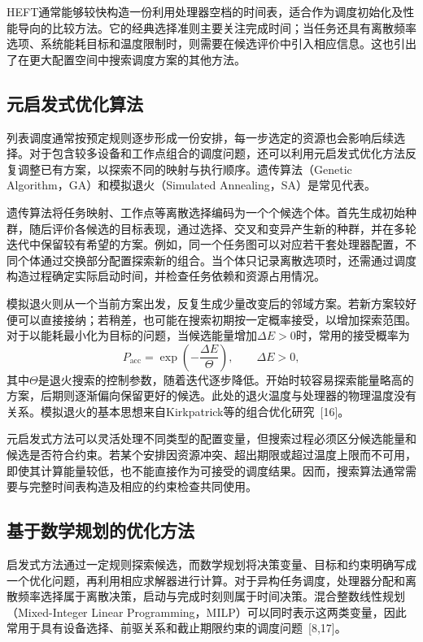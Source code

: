 HEFT通常能够较快构造一份利用处理器空档的时间表，适合作为调度初始化及性能导向的比较方法。它的经典选择准则主要关注完成时间；当任务还具有离散频率选项、系统能耗目标和温度限制时，则需要在候选评价中引入相应信息。这也引出了在更大配置空间中搜索调度方案的其他方法。

\subsection{元启发式优化算法}

列表调度通常按预定规则逐步形成一份安排，每一步选定的资源也会影响后续选择。对于包含较多设备和工作点组合的调度问题，还可以利用元启发式优化方法反复调整已有方案，以探索不同的映射与执行顺序。遗传算法（Genetic Algorithm，GA）和模拟退火（Simulated Annealing，SA）是常见代表。

遗传算法将任务映射、工作点等离散选择编码为一个个候选个体。首先生成初始种群，随后评价各候选的目标表现，通过选择、交叉和变异产生新的种群，并在多轮迭代中保留较有希望的方案。例如，同一个任务图可以对应若干套处理器配置，不同个体通过交换部分配置探索新的组合。当个体只记录离散选项时，还需通过调度构造过程确定实际启动时间，并检查任务依赖和资源占用情况。

模拟退火则从一个当前方案出发，反复生成少量改变后的邻域方案。若新方案较好便可以直接接纳；若稍差，也可能在搜索初期按一定概率接受，以增加探索范围。对于以能耗最小化为目标的问题，当候选能量增加$\Delta E>0$时，常用的接受概率为
\begin{equation}\label{eq:ch2-sa}
 P_{\mathrm{acc}}=\exp\!\left(-\frac{\Delta E}{\Theta}\right),
 \qquad \Delta E>0,
\end{equation}
其中$\Theta$是退火搜索的控制参数，随着迭代逐步降低。开始时较容易探索能量略高的方案，后期则逐渐偏向保留更好的候选。此处的退火温度与处理器的物理温度没有关系。模拟退火的基本思想来自Kirkpatrick等的组合优化研究~[16]。

元启发式方法可以灵活处理不同类型的配置变量，但搜索过程必须区分候选能量和候选是否符合约束。若某个安排因资源冲突、超出期限或超过温度上限而不可用，即使其计算能量较低，也不能直接作为可接受的调度结果。因而，搜索算法通常需要与完整时间表构造及相应的约束检查共同使用。

\subsection{基于数学规划的优化方法}

启发式方法通过一定规则探索候选，而数学规划将决策变量、目标和约束明确写成一个优化问题，再利用相应求解器进行计算。对于异构任务调度，处理器分配和离散频率选择属于离散决策，启动与完成时刻则属于时间决策。混合整数线性规划（Mixed-Integer Linear Programming，MILP）可以同时表示这两类变量，因此常用于具有设备选择、前驱关系和截止期限约束的调度问题~[8,17]。

